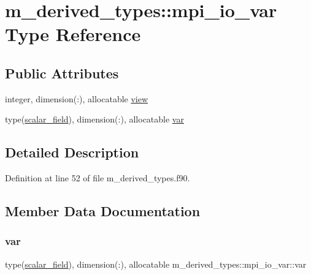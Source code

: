 \hypertarget{structm__derived__types_1_1mpi__io__var}{}\section{m\+\_\+derived\+\_\+types\+:\+:mpi\+\_\+io\+\_\+var Type Reference}
\label{structm__derived__types_1_1mpi__io__var}
\subsection*{Public Attributes}
\begin{DoxyCompactItemize}
\item 
integer, dimension(\+:), allocatable \hyperlink{structm__derived__types_1_1mpi__io__var_a19194d57a71bab3f81f1bb6c05743fed}{view}
\item 
type(\hyperlink{structm__derived__types_1_1scalar__field}{scalar\+\_\+field}), dimension(\+:), allocatable \hyperlink{structm__derived__types_1_1mpi__io__var_a41c471a62a6f28ebeeee8e51327d59f7}{var}
\end{DoxyCompactItemize}


\subsection{Detailed Description}


Definition at line 52 of file m\+\_\+derived\+\_\+types.\+f90.



\subsection{Member Data Documentation}
\mbox{\label{structm__derived__types_1_1mpi__io__var_a41c471a62a6f28ebeeee8e51327d59f7}} 
\subsubsection{\texorpdfstring{var}{var}}
{\footnotesize\ttfamily type(\hyperlink{structm__derived__types_1_1scalar__field}{scalar\+\_\+field}), dimension(\+:), allocatable m\+\_\+derived\+\_\+types\+::mpi\+\_\+io\+\_\+var\+::var}



